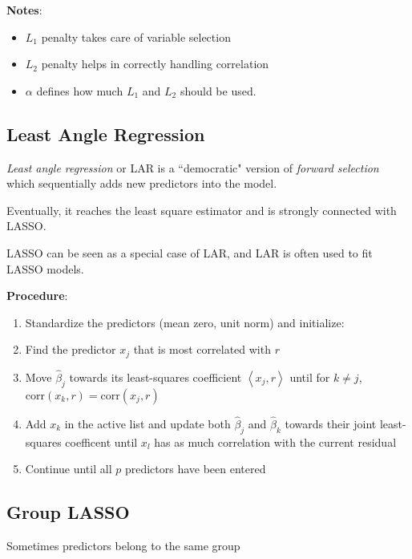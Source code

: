 \documentclass[twoside,twocolumn,10pt]{revtex4-1}
\begin{document}
	\textbf{Notes}:
	
	\begin{itemize}
	\item $L_1$ penalty takes care of variable selection
	\item $L_2$ penalty helps in correctly handling correlation
	\item $\alpha$ defines how much $L_1$ and $L_2$ should be used.
	\end{itemize}
		
	\subsection{Least Angle Regression}
	
	\textit{Least angle regression} or LAR is a ``democratic" version of \textit{forward selection} which sequentially adds new predictors into the model.
	
	Eventually, it reaches the least square estimator and is strongly connected with LASSO.
	
	LASSO can be seen as a special case of LAR, and LAR is often used to fit LASSO models.
	
	\textbf{Procedure}:
	
	\begin{enumerate}
	\item Standardize the predictors (mean zero, unit norm) and initialize:
	\item Find the predictor $x_j$ that is most correlated with $r$
	\item Move $\hat{\beta}_j$ towards its least-squares coefficient $\left\langle x_j, r \right\rangle$ until for $k \neq j$, $\text{corr}(x_k,r) = \text{corr}(x_j, r)$
	
	\item Add $x_k$ in the active list and update both $\hat{\beta}_j$ and $\hat{\beta}_k$ towards their joint least-squares coefficent until $x_l$ has as much correlation with the current residual
	
	\item Continue until all $p$ predictors have been entered
	\end{enumerate}
	 
	\subsection{Group LASSO}
	
	Sometimes predictors belong to the same group

	
\end{document}

